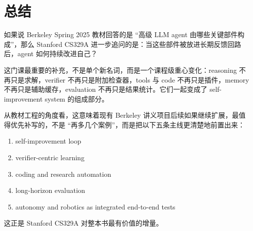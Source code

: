 \documentclass[UTF8]{ctexbook}
\begin{document}
\section{总结}

如果说 Berkeley Spring 2025 教材回答的是 ``高级 LLM agent 由哪些关键部件构成''，那么 Stanford CS329A 进一步追问的是：当这些部件被放进长期反馈回路后，agent 如何持续改进自己？

这门课最重要的补充，不是单个新名词，而是一个课程级重心变化：reasoning 不再只是求解，verifier 不再只是附加检查器，tools 与 code 不再只是插件，memory 不再只是辅助缓存，evaluation 不再只是结果统计。它们一起变成了 self-improvement system 的组成部分。

从教材工程的角度看，这意味着现有 Berkeley 讲义项目后续如果继续扩展，最值得优先补写的，不是 ``再多几个案例''，而是把以下五条主线更清楚地前置出来：
\begin{enumerate}
\item self-improvement loop
\item verifier-centric learning
\item coding and research automation
\item long-horizon evaluation
\item autonomy and robotics as integrated end-to-end tests
\end{enumerate}

这正是 Stanford CS329A 对整本书最有价值的增量。
\end{document}
